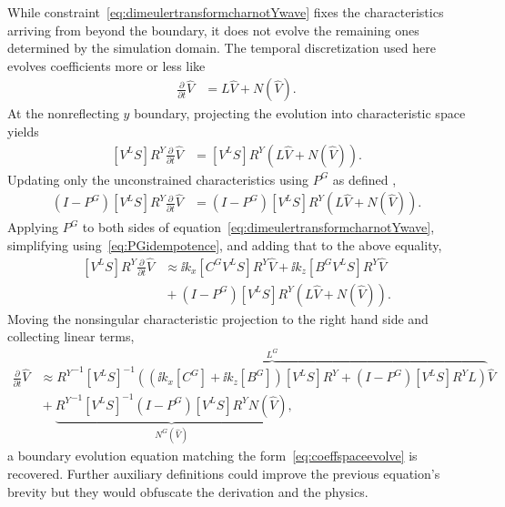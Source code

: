 While constraint~\eqref{eq:dimeulertransformcharnotYwave} fixes the
characteristics arriving from beyond the boundary, it does not evolve the
remaining ones determined by the simulation domain.  
The temporal discretization used here evolves coefficients more or less like
\begin{align}
\label{eq:coeffspaceevolve}
  \frac{\partial}{\partial{}t} \hat{V} &= L \hat{V} + N(\hat{V})
  .
\end{align}
At the nonreflecting $y$ boundary, projecting the evolution into characteristic
space yields
\begin{align}
  \left[V^L S\right] R^Y
  \frac{\partial}{\partial{}t} \hat{V} &=
  \left[V^L S\right] R^Y
  \left(
    L \hat{V}
    +
    N(\hat{V})
  \right)
  .
\end{align}
Updating only the unconstrained characteristics using $P^G$ as defined
,
\begin{align}
  \left(I - P^G\right)
  \left[V^L S\right] R^Y
  \frac{\partial}{\partial{}t} \hat{V}
&=
  \left(I - P^G\right)
  \left[V^L S\right] R^Y
  \left(
    L \hat{V}
    +
    N(\hat{V})
  \right)
  .
\end{align}
Applying $P^G$ to both sides of
equation~\eqref{eq:dimeulertransformcharnotYwave}, simplifying
using~\eqref{eq:PGidempotence}, and adding that to the above equality,
\begin{align}
  \left[V^L S\right]
  R^Y
  \frac{\partial}{\partial{}t}
  \hat{V}
&\approx
  \ii k_x
  \left[C^G V^L S\right]
  R^Y
  \hat{V}
  +
  \ii k_z
  \left[B^G V^L S\right]
  R^Y
  \hat{V}
\\
&{}+
  \left(I - P^G\right)
  \left[V^L S\right] R^Y
  \left(
    L \hat{V}
    +
    N(\hat{V})
  \right)
.
\end{align}
Moving the nonsingular characteristic projection to the right hand side and
collecting linear terms,
\begin{align}
\label{eq:dimeulertransformevolve}
  \frac{\partial}{\partial{}t}
  \hat{V}
&\approx
\overbrace{
  {R^Y}^{-1}
  \left[V^L S\right]^{-1}
  \left(
    \left( \ii k_x \left[C^G\right] + \ii k_z \left[B^G\right] \right)
    \left[V^L S\right] R^Y
    +
    \left(I-P^G\right)
    \left[V^L S\right] R^Y
    L
  \right)
}^{L^G}
  \hat{V}
\\
&{}+
\underbrace{
  {R^Y}^{-1}
  \left[V^L S\right]^{-1}
  \left(I - P^G\right)
  \left[V^L S\right] R^Y
  N(\hat{V})
}_{N^G\left(\hat{V}\right)}
,
\end{align}
a boundary evolution equation matching the form~\eqref{eq:coeffspaceevolve} is
recovered.  Further auxiliary definitions could improve the previous equation's
brevity but they would obfuscate the derivation and the physics.

